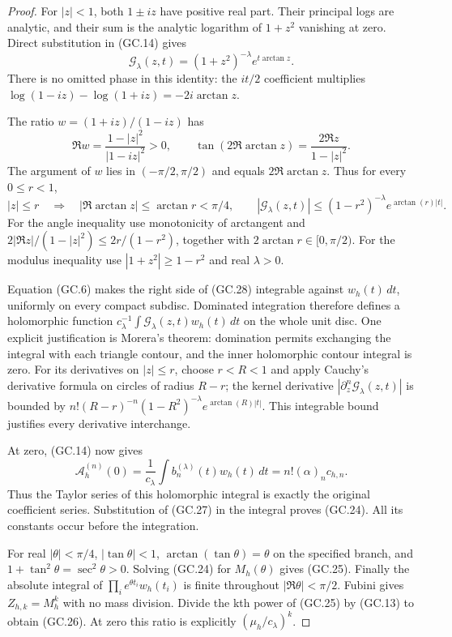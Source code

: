 \begin{proof}
For $|z|<1$, both $1\pm iz$ have positive real part. Their principal
logs are analytic, and their sum is the analytic logarithm of
$1+z^2$ vanishing at zero. Direct substitution in (GC.14) gives
\[
 \mathcal G_\lambda(z,t)=(1+z^2)^{-\lambda}
                              e^{t\arctan z}.                 \tag{GC.27}
\]
There is no omitted phase in this identity: the $it/2$ coefficient
multiplies $\log(1-iz)-\log(1+iz)=-2i\arctan z$.

The ratio $w=(1+iz)/(1-iz)$ has
\[
 \Re w=\frac{1-|z|^2}{|1-iz|^2}>0,\qquad
 \tan(2\Re\arctan z)=\frac{2\Re z}{1-|z|^2}.
\]
The argument of $w$ lies in $(-\pi/2,\pi/2)$ and equals
$2\Re\arctan z$. Thus for every $0\le r<1$,
\[
 |z|\le r\quad\Longrightarrow\quad
 |\Re\arctan z|\le\arctan r<\pi/4,
 \qquad
 |\mathcal G_\lambda(z,t)|
 \le(1-r^2)^{-\lambda}e^{\arctan(r)|t|}.                       \tag{GC.28}
\]
For the angle inequality use monotonicity of arctangent and
$2|\Re z|/(1-|z|^2)\le2r/(1-r^2)$, together with
$2\arctan r\in[0,\pi/2)$. For the modulus inequality use
$|1+z^2|\ge1-r^2$ and real $\lambda>0$.

Equation (GC.6) makes the right side of (GC.28) integrable against
$w_h(t)\,dt$, uniformly on every compact subdisc. Dominated
integration therefore defines a holomorphic function
$c_\lambda^{-1}\int\mathcal G_\lambda(z,t)w_h(t)\,dt$ on the
whole unit disc. One explicit justification is Morera's theorem:
domination permits exchanging the integral with each triangle
contour, and the inner holomorphic contour integral is zero.
For its derivatives on $|z|\le r$, choose $r<R<1$ and apply
Cauchy's derivative formula on circles of radius $R-r$; the
kernel derivative $|\partial_z^n\mathcal G_\lambda(z,t)|$ is bounded by
$n!(R-r)^{-n}(1-R^2)^{-\lambda}e^{\arctan(R)|t|}$.
This integrable bound justifies every derivative interchange.

At zero, (GC.14) now gives
\[
 \mathcal A_h^{(n)}(0)=\frac1{c_\lambda}
               \int b_n^{(\lambda)}(t)w_h(t)\,dt
           =n!(\alpha)_nc_{h,n}.                              \tag{GC.29}
\]
Thus the Taylor series of this holomorphic integral is exactly the
original coefficient series. Substitution of (GC.27) in the integral
proves (GC.24). All its constants occur before the integration.

For real $|\theta|<\pi/4$, $|\tan\theta|<1$,
$\arctan(\tan\theta)=\theta$ on the specified branch, and
$1+\tan^2\theta=\sec^2\theta>0$. Solving (GC.24) for
$M_h(\theta)$ gives (GC.25). Finally the absolute integral of
$\prod_i e^{\theta t_i}w_h(t_i)$ is finite throughout
$|\Re\theta|<\pi/2$. Fubini gives $Z_{h,k}=M_h^k$ with no
mass division. Divide the kth power of (GC.25) by (GC.13) to
obtain (GC.26). At zero this ratio is explicitly
$(\mu_h/c_\lambda)^k$.
\end{proof}

